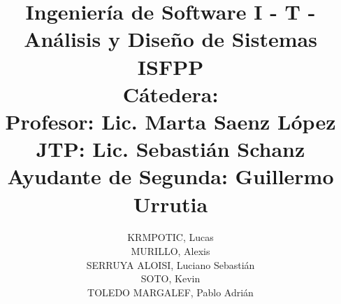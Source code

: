 \documentclass[12pt]{extarticle}
\begin{document}
    \title{Ingeniería de Software I - T - Análisis y Diseño de Sistemas\\
    ISFPP\\
    \large{Cátedera:\\
    Profesor: Lic. Marta Saenz López\\
    JTP: Lic. Sebastián Schanz\\
    Ayudante de Segunda: Guillermo Urrutia}}
    \author{KRMPOTIC, Lucas\\
    MURILLO, Alexis\\
    SERRUYA ALOISI, Luciano Sebastián\\
    SOTO, Kevin\\
    TOLEDO MARGALEF, Pablo Adrián}
    \date{}
    \maketitle
    \pagebreak

    \pagestyle{fancy}
    \fancyhf{}
    \lfoot{\thepage}

    \tableofcontents


    \clearpage
\end{document}
